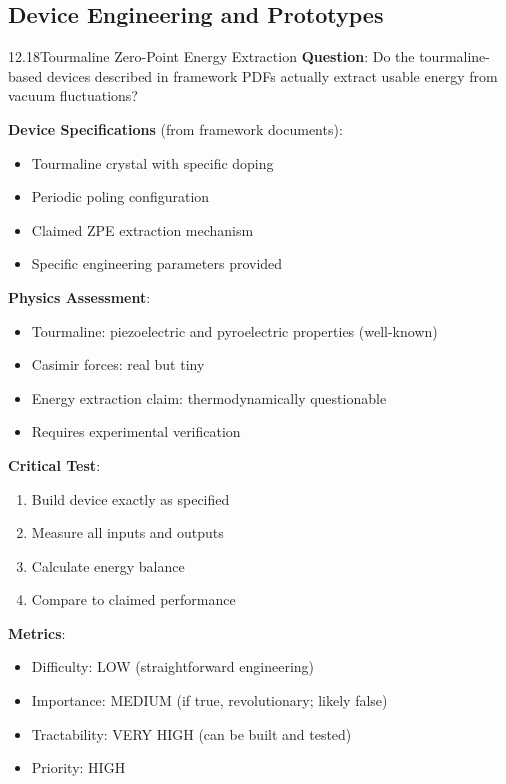 \subsection{Device Engineering and Prototypes}

\begin{openproblem}{12.18}{Tourmaline Zero-Point Energy Extraction}
\textbf{Question}: Do the tourmaline-based devices described in framework PDFs actually extract usable energy from vacuum fluctuations?

\textbf{Device Specifications} (from framework documents):
\begin{itemize}
    \item Tourmaline crystal with specific doping
    \item Periodic poling configuration
    \item Claimed ZPE extraction mechanism
    \item Specific engineering parameters provided
\end{itemize}

\textbf{Physics Assessment}:
\begin{itemize}
    \item Tourmaline: piezoelectric and pyroelectric properties (well-known)
    \item Casimir forces: real but tiny
    \item Energy extraction claim: thermodynamically questionable
    \item Requires experimental verification
\end{itemize}

\textbf{Critical Test}:
\begin{enumerate}
    \item Build device exactly as specified
    \item Measure all inputs and outputs
    \item Calculate energy balance
    \item Compare to claimed performance
\end{enumerate}

\textbf{Metrics}:
\begin{itemize}
    \item Difficulty: LOW (straightforward engineering)
    \item Importance: MEDIUM (if true, revolutionary; likely false)
    \item Tractability: VERY HIGH (can be built and tested)
    \item Priority: HIGH
\end{itemize}


\end{openproblem}
